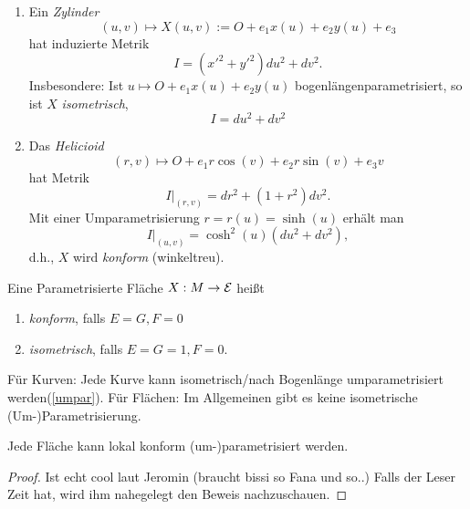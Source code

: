 \begin{example}
	
	\begin{enumerate}
		
		\item Ein \emph{Zylinder} $$ (u,v) \mapsto X(u,v) := O + e_1x(u) + e_2y(u) +e_3 $$
		hat induzierte Metrik \[ I = (x'^2 + y'^2)du^2 + dv^2. \]
		Insbesondere: Ist $ u \mapsto O+e_1x(u) + e_2y(u) $ bogenlängenparametrisiert, so ist $ X $ \emph{isometrisch},
		\[I = du^2 + dv^2\]
		
		\item Das \emph{Helicioid} \[ (r,v) \mapsto O + e_1r\cos(v)+e_2r\sin(v) + e_3v \]
		hat Metrik \[ I\big|_{(r,v)}=dr^2 + (1+r^2)dv^2. \]
		Mit einer Umparametrisierung $r = r(u) = \sinh(u)$ erhält man \[ I \big|_{(u,v)}= \cosh^2(u)(du^2+dv^2), \] d.h., $X$ wird \emph{konform} (winkeltreu).
		
	\end{enumerate}
	
\end{example}

\begin{definition}
	
	Eine Parametrisierte Fläche $ X : M \rightarrow \mathcal E $ heißt 
	\begin{enumerate}
		\item \emph{konform}, falls $ E = G, F = 0 $
		\item \emph{isometrisch}, falls $ E = G = 1, F= 0 $.
	\end{enumerate}
	
\end{definition}


\begin{remark}
	
	Für Kurven: Jede Kurve kann isometrisch/nach Bogenlänge umparametrisiert werden(\ref{umpar}).  Für Flächen: Im Allgemeinen gibt es keine isometrische (Um-)Parametrisierung.
	
\end{remark}

\begin{theorem}
	
	Jede Fläche kann lokal konform (um-)parametrisiert werden. 
	
\end{theorem}

\begin{proof}
	
	Ist echt cool laut Jeromin (braucht bissi so Fana und so..)
	Falls der Leser Zeit hat, wird ihm nahegelegt den Beweis nachzuschauen.
	
\end{proof}

